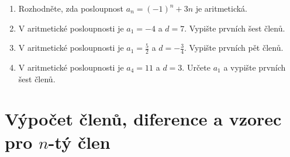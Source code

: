 \documentclass[11pt,a4paper]{article}
\begin{document}
\begin{enumerate}
    \item Rozhodněte, zda posloupnost $a_n=(-1)^n+3n$ je aritmetická.

    \item V aritmetické posloupnosti je $a_1=-4$ a $d=7$. Vypište prvních šest členů.

    \item V aritmetické posloupnosti je $a_1=\frac52$ a $d=-\frac34$. Vypište prvních pět členů.

    \item V aritmetické posloupnosti je $a_4=11$ a $d=3$. Určete $a_1$ a vypište prvních šest členů.
\end{enumerate}

\section*{Výpočet členů, diference a vzorec pro $n$-tý člen}
\end{document}
